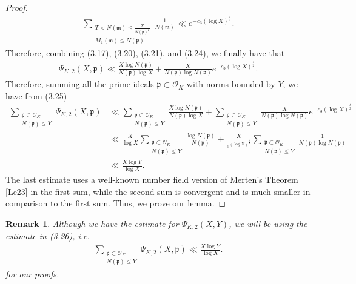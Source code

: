 \documentclass[12pt]{article}
\numberwithin{equation}{section}
\newtheorem{remark}[theorem]{Remark}
\numberwithin{equation}{section}
\begin{document}
\begin{proof}
\begin{align}
    \sum_{\substack{T<N(\mathfrak{m}) \leq \frac{X}{N(\mathfrak{p})^2} \\ M_1(\mathfrak{m})\leq N(\mathfrak{p})}} \frac{1}{N(\mathfrak{m})} \ll e^{-c_3(\log X)^{\frac{\delta}{2}}} .
\end{align}
Therefore, combining (3.17), (3.20), (3.21), and (3.24), we finally have that 
\begin{align}
     \Psi_{K,2}(X,\mathfrak{p}) \ll \frac{X\log N(\mathfrak{p})}{N(\mathfrak{p})\log X}+\frac{X}{N(\mathfrak{p})\log N(\mathfrak{p})}e^{-c_3(\log X)^{\frac{\delta }{2}}}.
\end{align}
Therefore, summing all the prime ideals $\mathfrak{p} \subset \mathcal{O}_K$ with norms bounded by $Y$, we have from (3.25)
\begin{align}
    \sum_{\substack{\mathfrak{p} \subset \mathcal{O}_K \\ N(\mathfrak{p}) \leq Y}}\Psi_{K,2}(X,\mathfrak{p}) &\ll  \sum_{\substack{\mathfrak{p} \subset \mathcal{O}_K \\ N(\mathfrak{p}) \leq Y}}\frac{X\log N(\mathfrak{p})}{N(\mathfrak{p})\log X} +  \sum_{\substack{\mathfrak{p} \subset \mathcal{O}_K \\ N(\mathfrak{p}) \leq Y}} \frac{X}{N(\mathfrak{p})\log N(\mathfrak{p})}e^{-c_3(\log X)^{\frac{\delta }{2}}} \nonumber \\ 
   &\ll \frac{X}{\log X}\sum_{\substack{\mathfrak{p} \subset \mathcal{O}_K \\ N(\mathfrak{p}) \leq Y}} \frac{\log N(\mathfrak{p})}{N(\mathfrak{p})}+ \frac{X}{e^{(\log X)^{\frac{\delta}{2}}}} \sum_{\substack{\mathfrak{p} \subset \mathcal{O}_K \\ N(\mathfrak{p}) \leq Y}} \frac{1}{N(\mathfrak{p})\log N(\mathfrak{p})} \nonumber \\
   &\ll \frac{X\log Y}{\log X}.
\end{align}
The last estimate uses a well-known number field version of Merten's Theorem [Le23] in the first sum, while the second sum is convergent and is much smaller in comparison to the first sum. Thus, we prove our lemma. 
\end{proof}
\begin{remark}
    Although we have the estimate for $\Psi_{K,2}(X,Y)$, we will be using the estimate in (3.26), i.e.
    \begin{align}
         \sum_{\substack{\mathfrak{p} \subset \mathcal{O}_K \\ N(\mathfrak{p}) \leq Y}}\Psi_{K,2}(X,\mathfrak{p})
\ll \frac{X\log Y}{\log X}.
    \end{align}
    for our proofs.
\end{remark}
\end{document}
